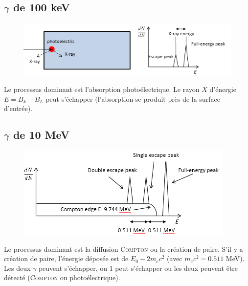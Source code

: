 \subsection{$\gamma$ de 100 keV}
	\begin{figure}
	\vspace{-5mm}
	\includegraphics[scale=0.5]{ch10/image10}
	\end{figure}
Le processus dominant est l'absorption photoélectrique. Le rayon $X$ d'énergie $E=B_k-B_L$ peut 
s'échapper (l'absorption se produit près de la surface d'entrée).\\


\subsection{$\gamma$ de 10 MeV}
	\begin{figure}
	\vspace{-7mm}
	\includegraphics[scale=0.6]{ch10/image11}
	\end{figure}
Le processus dominant est la diffusion \textsc{Compton} ou la création de paire. S'il y a création
 de paire, l'énergie déposée est de $E_0-2m_ec^2$ (avec $m_ec^2=0.511$ MeV). Les deux $\gamma$ 
 peuvent s'échapper, ou 1 peut s'échapper ou les deux peuvent être détecté (\textsc{Compton} ou
 photoélectrique).\\
 

